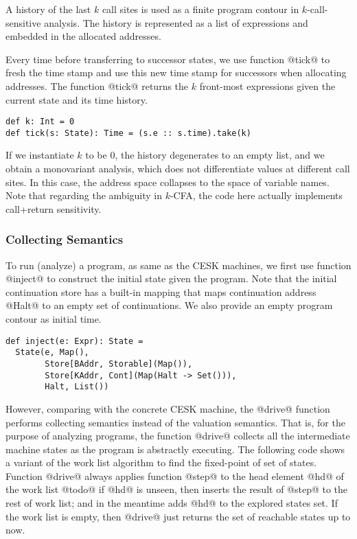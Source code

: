 \documentclass[acmsmall,review,anonymous]{acmart}\settopmatter{printfolios=true,printccs=false,printacmref=false}
\begin{document}
A history of the last $k$ call sites is used as a finite program contour in
$k$-call-sensitive analysis.
The history is represented as a list of expressions and embedded
in the allocated addresses.

Every time before transferring to successor states, we use function @tick@ to
fresh the time stamp and use this new time stamp for successors when allocating addresses.
The function @tick@ returns the $k$ front-most expressions given the current state and its
time history.

\begin{lstlisting}
def k: Int = 0
def tick(s: State): Time = (s.e :: s.time).take(k)
\end{lstlisting}

If we instantiate $k$ to be $0$, the history degenerates to an empty list,
and we obtain a monovariant analysis, which does
not differentiate values at different call sites. In this case, the address
space collapses to the space of variable names.
Note that regarding the ambiguity in $k$-CFA\cite{Gilray:2016:ACP:2951913.2951936},
the code here actually implements call+return sensitivity.

\subsubsection{Collecting Semantics}

To run (analyze) a program, as same as the CESK machines,
we first use function @inject@ to construct the initial state given the program.
Note that the initial continuation store has a built-in mapping that maps continuation address
@Halt@ to an empty set of continuations.
We also provide an empty program contour as initial time.
\begin{lstlisting}
def inject(e: Expr): State =
  State(e, Map(),
        Store[BAddr, Storable](Map()),
        Store[KAddr, Cont](Map(Halt -> Set())),
        Halt, List())
\end{lstlisting}

However, comparing with the concrete CESK machine, the
@drive@ function performs collecting semantics instead of the valuation
semantics. That is, for the purpose of analyzing programs, the function @drive@
collects all the intermediate machine states as the program is abstractly executing.
The following code shows a variant of the work list algorithm to find the fixed-point
of set of states.
Function @drive@ always applies function @step@ to the head element @hd@ of
the work list @todo@ if @hd@ is unseen, then inserts the result of @step@ to
the rest of work list; and in the meantime adds @hd@ to the explored states set.
If the work list is empty, then @drive@ just returns the set of reachable states
up to now.
\end{document}
